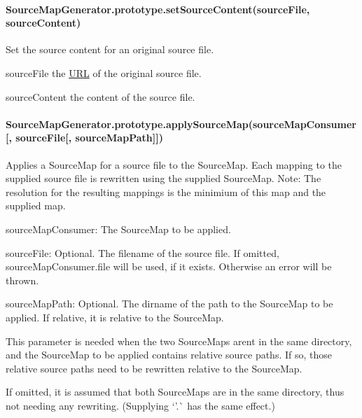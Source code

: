 \paragraph*{Source\+Map\+Generator.\+prototype.\+set\+Source\+Content(source\+File, source\+Content)}

Set the source content for an original source file.


\begin{DoxyItemize}
\item {\ttfamily source\+File} the \mbox{\hyperlink{namespace_u_r_l}{U\+RL}} of the original source file.
\item {\ttfamily source\+Content} the content of the source file.
\end{DoxyItemize}

\paragraph*{Source\+Map\+Generator.\+prototype.\+apply\+Source\+Map(source\+Map\+Consumer\mbox{[}, source\+File\mbox{[}, source\+Map\+Path\mbox{]}\mbox{]})}

Applies a Source\+Map for a source file to the Source\+Map. Each mapping to the supplied source file is rewritten using the supplied Source\+Map. Note\+: The resolution for the resulting mappings is the minimium of this map and the supplied map.


\begin{DoxyItemize}
\item {\ttfamily source\+Map\+Consumer}\+: The Source\+Map to be applied.
\item {\ttfamily source\+File}\+: Optional. The filename of the source file. If omitted, source\+Map\+Consumer.\+file will be used, if it exists. Otherwise an error will be thrown.
\item {\ttfamily source\+Map\+Path}\+: Optional. The dirname of the path to the Source\+Map to be applied. If relative, it is relative to the Source\+Map.

This parameter is needed when the two Source\+Maps aren\textquotesingle{}t in the same directory, and the Source\+Map to be applied contains relative source paths. If so, those relative source paths need to be rewritten relative to the Source\+Map.

If omitted, it is assumed that both Source\+Maps are in the same directory, thus not needing any rewriting. (Supplying `'.\textquotesingle{}\`{} has the same effect.)
\end{DoxyItemize}

